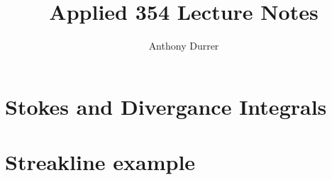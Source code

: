\documentclass{article}
\title{Applied 354 Lecture Notes}
\author{Anthony Durrer}
\date{ }
\begin{document}
\maketitle

\section{Stokes and Divergance Integrals}



\section{Streakline example}

\end{document}
